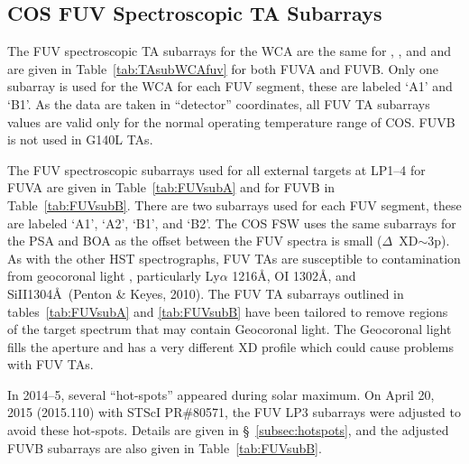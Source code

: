 \subsection{COS FUV Spectroscopic TA Subarrays}\label{subsec:FUVsupSUBS}
The FUV spectroscopic TA subarrays for the WCA are the same for ,  , and 
and are given in Table~\ref{tab:TAsubWCAfuv} for both FUVA and FUVB.
Only one subarray is used for the WCA for each FUV segment, these are labeled `A1' and `B1'.
As the data are taken in ``detector'' coordinates, all FUV TA subarrays values are valid only for the normal operating temperature range of COS. FUVB is not used in G140L TAs.

The FUV spectroscopic subarrays used for all external targets at LP1--4 for FUVA are given in Table~\ref{tab:FUVsubA} and for FUVB in Table~\ref{tab:FUVsubB}.
There are two subarrays used for each FUV segment, these are labeled `A1', `A2', `B1', and `B2'.
The COS FSW uses the same subarrays for the PSA and BOA as the offset between the FUV spectra is small ($\Delta$~XD$\sim$3p).
As with the other HST spectrographs, FUV TAs are susceptible to contamination from geocoronal light , particularly Ly$\alpha$ 1216\AA, {\rm O}\textsc{I} 1302\AA, and {\rm Si}{\sc II}1304\AA\ (Penton \& Keyes, 2010).
The FUV TA subarrays outlined in tables~\ref{tab:FUVsubA} and \ref{tab:FUVsubB} have been tailored to remove regions
of the target spectrum that may contain Geocoronal light.
The Geocoronal light fills the aperture and has a very different XD profile which could cause problems with FUV TAs.

In 2014--5, several ``hot-spots'' appeared during solar maximum. On April 20, 2015 (2015.110) with STScI PR\#80571, the FUV LP3 subarrays were adjusted to avoid these hot-spots.
Details are given in \S~\ref{subsec:hotspots}, and the adjusted FUVB subarrays are also given in Table~\ref{tab:FUVsubB}.

